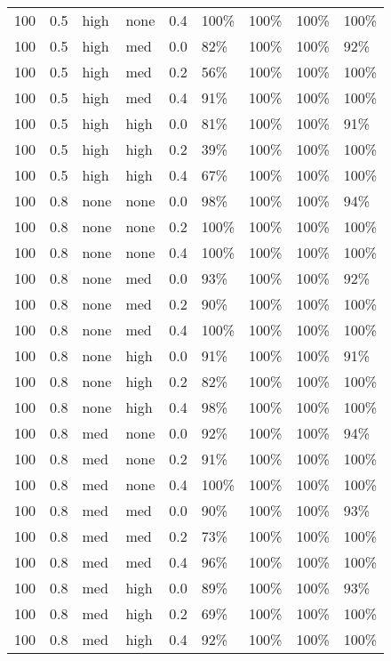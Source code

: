 \begin{longtable}{rrllrllll}
  100 & 0.5 & high & none & 0.4 & 100\% & 100\% & 100\% & 100\% \\ 
  100 & 0.5 & high & med & 0.0 & 82\% & 100\% & 100\% & 92\% \\ 
  100 & 0.5 & high & med & 0.2 & 56\% & 100\% & 100\% & 100\% \\ 
  100 & 0.5 & high & med & 0.4 & 91\% & 100\% & 100\% & 100\% \\ 
  100 & 0.5 & high & high & 0.0 & 81\% & 100\% & 100\% & 91\% \\ 
  100 & 0.5 & high & high & 0.2 & 39\% & 100\% & 100\% & 100\% \\ 
  100 & 0.5 & high & high & 0.4 & 67\% & 100\% & 100\% & 100\% \\ 
  100 & 0.8 & none & none & 0.0 & 98\% & 100\% & 100\% & 94\% \\ 
  100 & 0.8 & none & none & 0.2 & 100\% & 100\% & 100\% & 100\% \\ 
  100 & 0.8 & none & none & 0.4 & 100\% & 100\% & 100\% & 100\% \\ 
  100 & 0.8 & none & med & 0.0 & 93\% & 100\% & 100\% & 92\% \\ 
  100 & 0.8 & none & med & 0.2 & 90\% & 100\% & 100\% & 100\% \\ 
  100 & 0.8 & none & med & 0.4 & 100\% & 100\% & 100\% & 100\% \\ 
  100 & 0.8 & none & high & 0.0 & 91\% & 100\% & 100\% & 91\% \\ 
  100 & 0.8 & none & high & 0.2 & 82\% & 100\% & 100\% & 100\% \\ 
  100 & 0.8 & none & high & 0.4 & 98\% & 100\% & 100\% & 100\% \\ 
  100 & 0.8 & med & none & 0.0 & 92\% & 100\% & 100\% & 94\% \\ 
  100 & 0.8 & med & none & 0.2 & 91\% & 100\% & 100\% & 100\% \\ 
  100 & 0.8 & med & none & 0.4 & 100\% & 100\% & 100\% & 100\% \\ 
  100 & 0.8 & med & med & 0.0 & 90\% & 100\% & 100\% & 93\% \\ 
  100 & 0.8 & med & med & 0.2 & 73\% & 100\% & 100\% & 100\% \\ 
  100 & 0.8 & med & med & 0.4 & 96\% & 100\% & 100\% & 100\% \\ 
  100 & 0.8 & med & high & 0.0 & 89\% & 100\% & 100\% & 93\% \\ 
  100 & 0.8 & med & high & 0.2 & 69\% & 100\% & 100\% & 100\% \\ 
  100 & 0.8 & med & high & 0.4 & 92\% & 100\% & 100\% & 100\% \\ 

\end{longtable}

